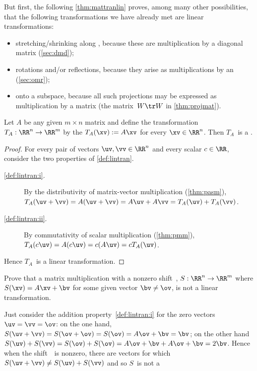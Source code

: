 \begin{example} 
But first, the following \cref{thm:mattranlin} proves, among many other possibilities, that the following transformations we have already met are linear transformations:
\begin{itemize}
\item stretching\slash shrinking along , because these are multiplication by a diagonal matrix (\cref{sec:dmd});
\item {}rotations and/or reflections, because they arise as multiplications by an  (\cref{sec:omr});
\item {} onto a subspace, because all such projections may be expressed as multiplication by a matrix (the matrix~\(W\tr W\) in \cref{thm:projmat}).
\aqed
\end{itemize}
\end{example}


\begin{theorem} \label{thm:mattranlin} 
Let \(A\) be any given \(m\times n\) matrix and define the transformation \(T_A:\RR^n\to\RR^m\)  by the  \(T_A(\xv):=A\xv\) for every \(\xv\in\RR^n\). 
Then \(T_A\)~is a .
\end{theorem}
\begin{proof} 
For every pair of vectors \(\uv,\vv\in\RR^n\) and every scalar \(c\in\RR\), consider the two properties of \cref{def:lintran}.
\begin{description}
\item[\ref{def:lintran:i}.] By the distributivity of matrix-vector multiplication (\cref{thm:pasm}), \(T_A(\uv+\vv)=A(\uv+\vv)=A\uv+A\vv=T_A(\uv)+T_A(\vv)\).
\item[\ref{def:lintran:ii}.] By commutativity of scalar multiplication (\cref{thm:pmm}), \(T_A(c\uv)=A(c\uv)=c(A\uv)=cT_A(\uv)\).
\end{description}
Hence \(T_A\)~is a linear transformation.
\end{proof}



\begin{example} 
Prove that a matrix multiplication with a nonzero shift~\bv, \(S:\RR^n\to\RR^m\) where \(S(\xv)=A\xv+\bv\) for some given vector \(\bv\neq\ov\), is not a linear transformation.
\begin{solution} 
Just consider the addition property~\ref{def:lintran:i} for the zero vectors \(\uv=\vv=\ov\):  
on the one hand, \(S(\uv+\vv)=S(\ov+\ov)=S(\ov)=A\ov+\bv=\bv\); 
on the other hand \(S(\uv)+S(\vv)=S(\ov)+S(\ov)=A\ov+\bv+A\ov+\bv=2\bv\).  
Hence when the shift~\bv\ is nonzero, there are vectors for which \(S(\uv+\vv)\neq S(\uv)+S(\vv)\) and so \(S\)~is not a 
\end{solution}
\end{example}



